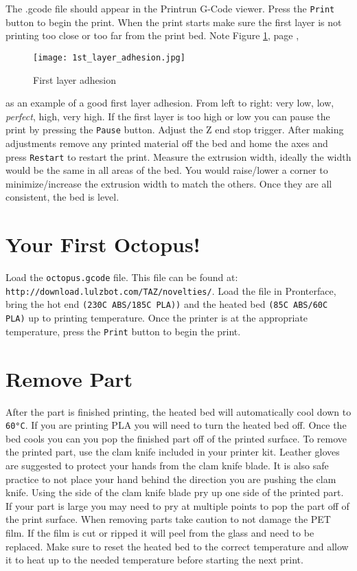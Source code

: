 The .gcode file should appear in the Printrun G-Code viewer. Press the \texttt{Print} button to begin the print. When the print starts make sure the first layer is not printing too close or too far from the print bed. Note 
Figure \ref{fig:1st_layer_adhesion}, page \pageref{fig:1st_layer_adhesion},
\begin{figure}[hbt]
\centering
\texttt{[image: 1st\_layer\_adhesion.jpg]}
\caption{First layer adhesion}
\label{fig:1st_layer_adhesion}
\end{figure}
as an example of a good first layer adhesion. From left to right: very low, low, \emph{perfect}, high, very high. If the first layer is too high or low you can pause the print by pressing the \texttt{Pause} button. Adjust the Z end stop trigger. After making adjustments remove any printed material off the bed and home the axes and press \texttt{Restart} to restart the print. Measure the extrusion width, ideally the width would be the same in all areas of the bed. You would raise/lower a corner to minimize/increase the extrusion width to match the others. Once they are all consistent, the bed is level.

\section{Your First Octopus!}
Load the \texttt{octopus.gcode} file. This file can be found at:
\texttt{http://download.lulzbot.com/TAZ/novelties/}. Load the file in Pronterface, bring the hot end \texttt{(230C ABS/185C PLA))} and the heated bed \texttt{(85C ABS/60C PLA)} up to printing temperature. Once the printer is at the appropriate temperature, press the \texttt{Print} button to begin the print.

\section{Remove Part}
After the part is finished printing, the heated bed will automatically cool down to \texttt{60°C}. If you are printing PLA you will need to turn the heated bed off. Once the bed cools you can you pop the finished part off of the printed surface. To remove the printed part, use the clam knife included in your printer kit. Leather gloves are suggested to protect your hands from the clam knife blade. It is also safe practice to not place your hand behind the direction you are pushing the clam knife. Using the side of the clam knife blade pry up one side of the printed part. If your part is large you may need to pry at multiple points to pop the part off of the print surface. When removing parts take caution to not damage the PET film. If the film is cut or ripped it will peel from the glass and need to be replaced. Make sure to reset the heated bed to the correct temperature and allow it to heat up to the needed temperature before starting the next print.

